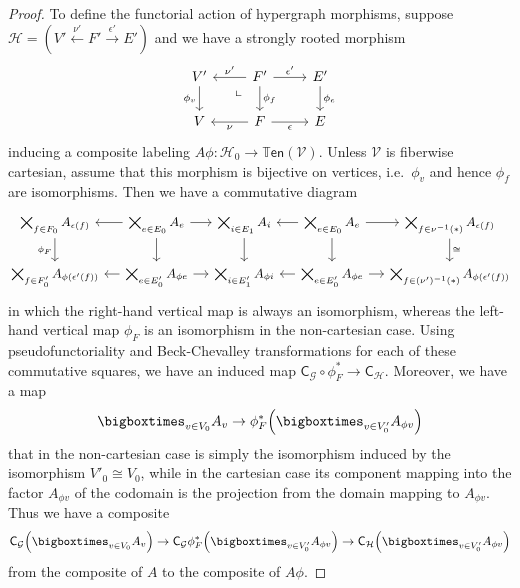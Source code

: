 \documentclass{article}
\theoremstyle{definition}
\theoremstyle{remark}
\def\G{\mathcal{G}}
\def\H{\mathcal{H}}
\def\V{\mathscr{V}}
\def\ten{\mathbb{T}\mathsf{en}}
\newcommand{\dlpullback}[1][dl]{\ar[#1,phantom,near start,"\llcorner"]}
\let\xto\xrightarrow
\let\xot\xleftarrow
\begin{document}
\begin{proof}
  To define the functorial action of hypergraph morphisms, suppose $\H = (V'\xot{\nu'} F' \xto{\epsilon'} E')$ and we have a strongly rooted morphism
  \[
  \begin{tikzcd}
    V' \ar[d,"\phi_v"'] & F' \ar[d,"\phi_f"] \ar[r,"\epsilon'"] \ar[l,"\nu'"'] \dlpullback[dl] & E' \ar[d,"\phi_e"]\\
    V  & F \ar[r,"\epsilon"'] \ar[l,"\nu"] & E
  \end{tikzcd}
  \]
  inducing a composite labeling $A\phi : \H_0 \to \ten(\V)$.
  Unless $\V$ is fiberwise cartesian, assume that this morphism is bijective on vertices, i.e.\ $\phi_v$ and hence $\phi_f$ are isomorphisms.
  Then we have a commutative diagram
  \[\hspace{-2cm}\small
  \begin{tikzcd}[column sep=small]
    \bigtimes_{f\in F_0} A_{\epsilon(f)} \ar[d,"\phi_F"'] &
    \bigtimes_{e\in E_0} A_e \ar[l] \ar[r] \ar[d] &
    \bigtimes_{i\in E_1} A_{i} \ar[d] &
    \bigtimes_{e\in E_0} A_e \ar[l] \ar[r] \ar[d] &
    \bigtimes_{f\in \nu^{-1}(\ast)} A_{\epsilon(f)} \ar[d,"\cong"] \\
    \bigtimes_{f\in F'_0} A_{\phi(\epsilon'(f))}  &
    \bigtimes_{e\in E'_0} A_{\phi e} \ar[l] \ar[r]  &
    \bigtimes_{i\in E'_1} A_{\phi i}  &
    \bigtimes_{e\in E'_0} A_{\phi e} \ar[l] \ar[r]  &
    \bigtimes_{f\in (\nu')^{-1}(\ast)} A_{\phi(\epsilon'(f))} 
  \end{tikzcd}\hspace{-2cm}
  \]
  in which the right-hand vertical map is always an isomorphism, whereas the left-hand vertical map $\phi_F$ is an isomorphism in the non-cartesian case.
  Using pseudofunctoriality and Beck-Chevalley transformations for each of these commutative squares, we have an induced map $\mathsf{C}_\G \circ \phi_F^* \to \mathsf{C}_\H$.
  Moreover, we have a map
  \[ \bigboxtimes_{v\in V_0} A_v \to \phi_F^*\Big(\bigboxtimes_{v\in V'_0} A_{\phi v}\Big)\]
  that in the non-cartesian case is simply the isomorphism induced by the isomorphism $V'_0 \cong V_0$, while in the cartesian case its component mapping into the factor $A_{\phi v}$ of the codomain is the projection from the domain mapping to $A_{\phi v}$.
  Thus we have a composite
  \[ \mathsf{C}_\G\Big( \bigboxtimes_{v\in V_0} A_v\Big)
  \to \mathsf{C}_\G\phi_F^*\Big(\bigboxtimes_{v\in V'_0} A_{\phi v}\Big)
  \to \mathsf{C}_\H\Big(\bigboxtimes_{v\in V'_0} A_{\phi v}\Big)
  \]
  from the composite of $A$ to the composite of $A\phi$.
\end{proof}
\end{document}
